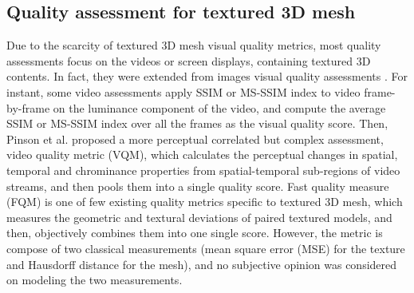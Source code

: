 \subsection{Quality assessment for textured 3D mesh}
Due to the scarcity of textured 3D mesh visual quality metrics, most quality assessments focus on the videos or screen displays, containing textured 3D contents. In fact, they were extended from images visual quality assessments \cite{Seshadrinathan_2010}. For instant, some video assessments \cite{Zhou_Wang} apply SSIM or MS-SSIM index to video frame-by-frame on the luminance component of the video, and compute the average SSIM or MS-SSIM index over all the frames as the visual quality score. Then, Pinson et al. \cite{Pinson_2004} proposed a more perceptual correlated but complex assessment, video quality metric (VQM), which calculates the perceptual changes in spatial, temporal and chrominance properties from spatial-temporal sub-regions of video streams, and then pools them into a single quality score.  Fast quality measure (FQM) \cite{Tian_2004} is one of few existing quality metrics specific to textured 3D mesh, which measures the geometric and textural deviations of paired textured models, and then, objectively combines them into one single score. However, the metric is compose of two classical measurements (mean square error (MSE) for the texture and Hausdorff distance for the mesh), and no subjective opinion was considered on modeling the two measurements.
